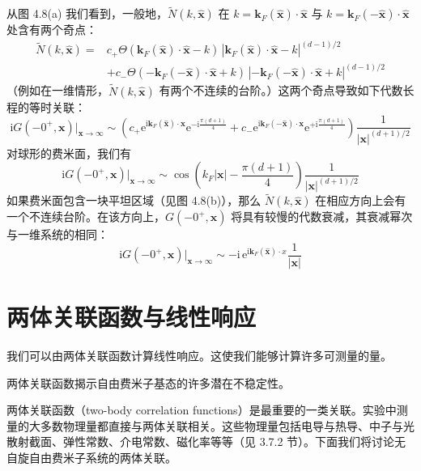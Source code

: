 从图 4.8(a) 我们看到，一般地，$\tilde{N}(k,\hat{\pmb{x}})$ 在 $k = \pmb{k}_{F}(\hat{\pmb{x}})\cdot\hat{\pmb{x}}$ 与 $k = \pmb{k}_{F}(-\hat{\pmb{x}})\cdot\hat{\pmb{x}}$ 处含有两个奇点：
\begin{align*}
\tilde{N}(k,\hat{\pmb{x}}) ={}& c_{+}\Theta(\pmb{k}_{F}(\hat{\pmb{x}})\cdot\hat{\pmb{x}} - k)\,|\pmb{k}_{F}(\hat{\pmb{x}})\cdot\hat{\pmb{x}} - k|^{(d-1)/2}\\
&+ c_{-}\Theta(-\pmb{k}_{F}(-\hat{\pmb{x}})\cdot\hat{\pmb{x}} + k)\,\left|-\pmb{k}_{F}(-\hat{\pmb{x}})\cdot\hat{\pmb{x}} + k\right|^{(d-1)/2}
\end{align*}
（例如在一维情形，$\tilde{N}(k,\hat{\pmb{x}})$ 有两个不连续的台阶。）这两个奇点导致如下代数长程的等时关联：
\begin{equation*}
\mathrm{i}G(-0^{+},\pmb{x})\big|_{\pmb{x}\to\infty} \sim \left(c_{+}\mathrm{e}^{\mathrm{i}\pmb{k}_{F}(\hat{\pmb{x}})\cdot\pmb{x}}\mathrm{e}^{-\mathrm{i}\frac{\pi(d+1)}{4}} + c_{-}\mathrm{e}^{\mathrm{i}\pmb{k}_{F}(-\hat{\pmb{x}})\cdot\pmb{x}}\mathrm{e}^{+\mathrm{i}\frac{\pi(d+1)}{4}}\right)\frac{1}{|\pmb{x}|^{(d+1)/2}}
\end{equation*}
对球形的费米面，我们有
\begin{equation*}
\mathrm{i}G(-0^{+},\pmb{x})\big|_{\pmb{x}\to\infty} \sim \cos\left(k_{F}|\pmb{x}| - \frac{\pi(d+1)}{4}\right)\frac{1}{|\pmb{x}|^{(d+1)/2}}
\end{equation*}
如果费米面包含一块平坦区域（见图 4.8(b)），那么 $\tilde{N}(k,\hat{\pmb{x}})$ 在相应方向上会有一个不连续台阶。在该方向上，$G(-0^{+},\pmb{x})$ 将具有较慢的代数衰减，其衰减幂次与一维系统的相同：
\begin{equation*}
\mathrm{i}G(-0^{+},\pmb{x})\big|_{\pmb{x}\to\infty} \sim -\mathrm{i}\,\mathrm{e}^{\mathrm{i}\pmb{k}_{F}(\hat{\pmb{x}})\cdot x}\frac{1}{|\pmb{x}|}
\end{equation*}

\section{两体关联函数与线性响应}

\begin{keypoints}
\item 我们可以由两体关联函数计算线性响应。这使我们能够计算许多可测量的量。
\item 两体关联函数揭示自由费米子基态的许多潜在不稳定性。
\end{keypoints}

两体关联函数（two-body correlation functions）是最重要的一类关联。实验中测量的大多数物理量都直接与两体关联相关。这些物理量包括电导与热导、中子与光散射截面、弹性常数、介电常数、磁化率等等（见 3.7.2 节）。下面我们将讨论无自旋自由费米子系统的两体关联。

